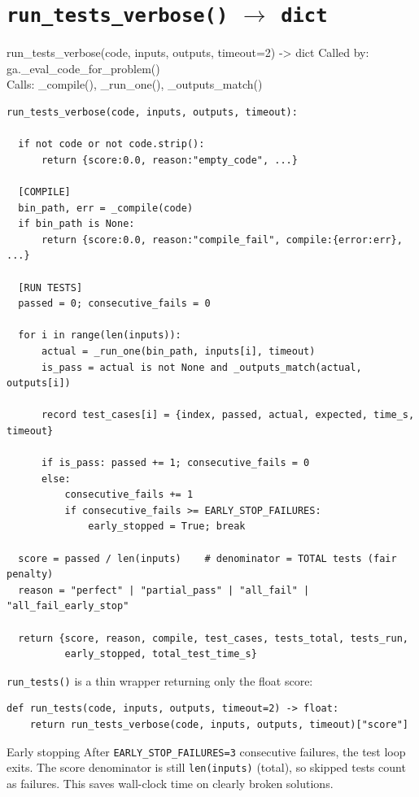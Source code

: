 \documentclass[11pt,a4paper]{report}
\newcommand{\fn}[1]{\texttt{#1}}
\begin{document}
\section{\fn{run\_tests\_verbose()} $\to$ \fn{dict}}

\begin{spec}{run\_tests\_verbose(code, inputs, outputs, timeout=2) -> dict}
Called by: ga.\_eval\_code\_for\_problem() \\
Calls: \_compile(), \_run\_one(), \_outputs\_match()
\end{spec}

\begin{lstlisting}[style=chain]
run_tests_verbose(code, inputs, outputs, timeout):

  if not code or not code.strip():
      return {score:0.0, reason:"empty_code", ...}

  [COMPILE]
  bin_path, err = _compile(code)
  if bin_path is None:
      return {score:0.0, reason:"compile_fail", compile:{error:err}, ...}

  [RUN TESTS]
  passed = 0; consecutive_fails = 0

  for i in range(len(inputs)):
      actual = _run_one(bin_path, inputs[i], timeout)
      is_pass = actual is not None and _outputs_match(actual, outputs[i])

      record test_cases[i] = {index, passed, actual, expected, time_s, timeout}

      if is_pass: passed += 1; consecutive_fails = 0
      else:
          consecutive_fails += 1
          if consecutive_fails >= EARLY_STOP_FAILURES:
              early_stopped = True; break

  score = passed / len(inputs)    # denominator = TOTAL tests (fair penalty)
  reason = "perfect" | "partial_pass" | "all_fail" | "all_fail_early_stop"

  return {score, reason, compile, test_cases, tests_total, tests_run,
          early_stopped, total_test_time_s}
\end{lstlisting}

\fn{run\_tests()} is a thin wrapper returning only the float score:
\begin{lstlisting}[style=py]
def run_tests(code, inputs, outputs, timeout=2) -> float:
    return run_tests_verbose(code, inputs, outputs, timeout)["score"]
\end{lstlisting}

\begin{concept}{Early stopping}
After \fn{EARLY\_STOP\_FAILURES=3} consecutive failures, the test loop exits.  The
score denominator is still \fn{len(inputs)} (total), so skipped tests count as
failures.  This saves wall-clock time on clearly broken solutions.
\end{concept}
\end{document}
